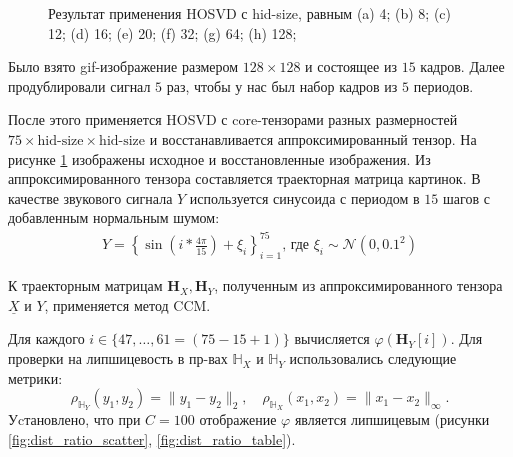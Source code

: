 \documentclass[a4paper,14pt]{article}
\newcommand{\uX}{\ensuremath{\underline{X}}}
\newcommand{\bH}{\mathbf{H}}
\newcommand{\dH}{\mathbb{H}}
\theoremstyle{plain} %
\theoremstyle{definition} %
\theoremstyle{remark} %
\begin{document}
\begin{figure}
		\caption{Результат применения HOSVD с hid-size, равным (a) 4; (b) 8; (c) 12; (d) 16; (e) 20; (f) 32; (g) 64; (h) 128;}
		\label{fig:various_core_tensors}
	\end{figure}

	Было взято gif-изображение размером $128 \times 128$ и состоящее из $15$ кадров. 
	Далее продублировали сигнал $5$ раз, чтобы у нас был набор кадров из $5$ периодов. 
	
	После этого применяется HOSVD с core-тензорами разных размерностей $75 \times \text{hid-size} \times \text{hid-size}$ и восстанавливается аппроксимированный тензор. На рисунке \ref{fig:various_core_tensors} изображены исходное и восстановленные изображения. 
	Из аппроксимированного тензора составляется траекторная матрица картинок. 
	В качестве звукового сигнала $Y$ используется синусоида с периодом в $15$ шагов с добавленным нормальным шумом:
	\begin{gather*}
		Y = \left\{\sin\left(i * \frac{4 \pi}{15} \right) + \xi_i \right\}_{i=1}^{75} \text{, где } \xi_i \sim \mathcal{N}(0, 0.1^2)
	\end{gather*}
	
	К траекторным матрицам $\bH_X, \bH_Y$, полученным из аппроксимированного тензора $\uX$ и $Y$, применяется метод CCM. 
	
	Для каждого $i \in \{ 47, \ldots, 61 = (75-15+1)\}$ вычисляется $\varphi(\bH_Y[i])$. Для проверки на липшицевость в пр-вах $\dH_X$ и $\dH_Y$ использовались следующие метрики:
	$$ \rho_{\dH_Y}(y_1, y_2) = \| y_1 - y_2 \|_2, \quad \rho_{\dH_X}(x_1, x_2) = \| x_1 - x_2 \|_{\infty}.$$
	Уcтановлено, что при $C = 100$ отображение $\varphi$ является липшицевым (рисунки \ref{fig:dist_ratio_scatter}, \ref{fig:dist_ratio_table}).  
	
\end{document}

